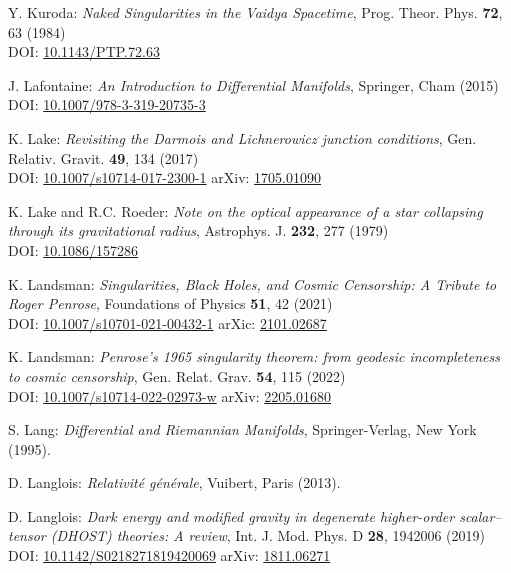 \begin{thebibliography}{123}
Y. Kuroda:
{\em Naked Singularities in the Vaidya Spacetime},
Prog. Theor. Phys. {\bf 72}, 63 (1984)\\
DOI: \href{https://doi.org/10.1143/PTP.72.63}{10.1143/PTP.72.63}

J. Lafontaine: {\em An Introduction to Differential Manifolds},
Springer, Cham (2015)\\
DOI: \href{https://doi.org/10.1007/978-3-319-20735-3}{10.1007/978-3-319-20735-3}

K. Lake:
{\em Revisiting the Darmois and Lichnerowicz junction conditions},
Gen. Relativ. Gravit. {\bf 49}, 134 (2017)\\
DOI: \href{https://doi.org/10.1007/s10714-017-2300-1}{10.1007/s10714-017-2300-1}\hfill
arXiv: \href{https://arxiv.org/abs/1705.01090}{1705.01090}

K. Lake and R.C. Roeder:
{\em Note on the optical appearance of a star collapsing through its gravitational radius},
Astrophys. J. {\bf 232}, 277 (1979)\\
DOI: \href{https://doi.org/10.1086/157286}{10.1086/157286}

K. Landsman:
{\em Singularities, Black Holes, and Cosmic Censorship:
A Tribute to Roger Penrose},
Foundations of Physics {\bf 51}, 42 (2021)\\
DOI: \href{https://doi.org/10.1007/s10701-021-00432-1}{10.1007/s10701-021-00432-1}\hfill
arXic: \href{https://arxiv.org/abs/2101.02687}{2101.02687}

K. Landsman:
{\em Penrose's 1965 singularity theorem: from geodesic incompleteness to cosmic censorship},
Gen. Relat. Grav. {\bf 54}, 115 (2022)\\
DOI: \href{https://doi.org/10.1007/s10714-022-02973-w}{10.1007/s10714-022-02973-w}\hfill
arXiv: \href{https://arxiv.org/abs/2205.01680}{2205.01680}

S. Lang:
{\em Differential and Riemannian Manifolds},
Springer-Verlag, New York (1995).

D. Langlois:
{\em Relativité générale},
Vuibert, Paris (2013).

D. Langlois:
{\em Dark energy and modified gravity in degenerate higher-order scalar–tensor (DHOST) theories: A review},
Int. J. Mod. Phys. D {\bf 28}, 1942006 (2019)\\
DOI: \href{https://doi.org/10.1142/S0218271819420069}{10.1142/S0218271819420069}\hfill
arXiv: \href{https://arxiv.org/abs/1811.06271}{1811.06271}


\end{thebibliography}
